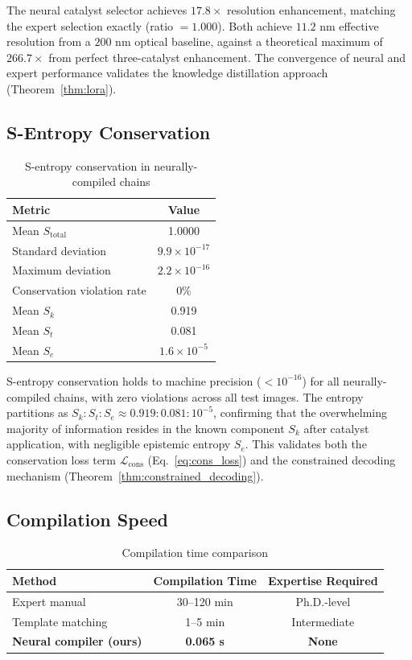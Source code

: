 \documentclass[11pt,a4paper]{article}
\theoremstyle{definition}
\theoremstyle{remark}
\newcommand{\loss}{\mathcal{L}}
\begin{document}
The neural catalyst selector achieves $17.8\times$ resolution enhancement, matching the expert selection exactly (ratio $= 1.000$). Both achieve $11.2$ nm effective resolution from a $200$ nm optical baseline, against a theoretical maximum of $266.7\times$ from perfect three-catalyst enhancement. The convergence of neural and expert performance validates the knowledge distillation approach (Theorem~\ref{thm:lora}).

\subsection{S-Entropy Conservation}

\begin{table}[H]
\centering
\caption{S-entropy conservation in neurally-compiled chains}
\label{tab:entropy}
\begin{tabular}{@{}lc@{}}
\toprule
Metric & Value \\
\midrule
Mean $S_{\text{total}}$ & 1.0000 \\
Standard deviation & $9.9 \times 10^{-17}$ \\
Maximum deviation & $2.2 \times 10^{-16}$ \\
Conservation violation rate & 0\% \\
Mean $S_k$ & 0.919 \\
Mean $S_t$ & 0.081 \\
Mean $S_e$ & $1.6 \times 10^{-5}$ \\
\bottomrule
\end{tabular}
\end{table}

S-entropy conservation holds to machine precision ($< 10^{-16}$) for all neurally-compiled chains, with zero violations across all test images. The entropy partitions as $S_k : S_t : S_e \approx 0.919 : 0.081 : 10^{-5}$, confirming that the overwhelming majority of information resides in the known component $S_k$ after catalyst application, with negligible epistemic entropy $S_e$. This validates both the conservation loss term $\loss_{\text{cons}}$ (Eq.~\ref{eq:cons_loss}) and the constrained decoding mechanism (Theorem~\ref{thm:constrained_decoding}).

\subsection{Compilation Speed}

\begin{table}[H]
\centering
\caption{Compilation time comparison}
\label{tab:speed}
\begin{tabular}{@{}lcc@{}}
\toprule
Method & Compilation Time & Expertise Required \\
\midrule
Expert manual & 30--120 min & Ph.D.-level \\
Template matching & 1--5 min & Intermediate \\
\textbf{Neural compiler (ours)} & \textbf{0.065 s} & \textbf{None} \\
\bottomrule
\end{tabular}
\end{table}
\end{document}
